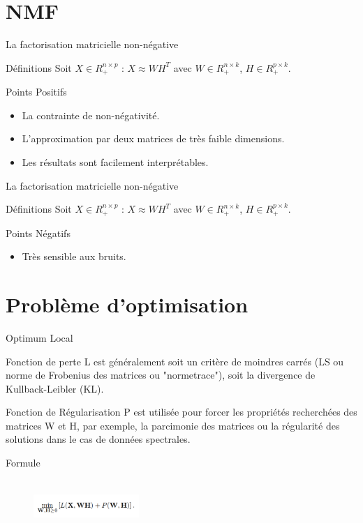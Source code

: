 \documentclass{beamer}
\begin{document}
\section{NMF}
\begin{frame}{La factorisation matricielle non-négative}
\begin{block}{Définitions}
Soit $X \in R_+^{n\times p}$ : $X \approx WH^T$ avec $W \in R_+^{n\times k}$, $H \in R_+^{p\times k}$.    
\end{block}
\begin{block}{Points Positifs}
\begin{itemize}
  \item La contrainte de non-négativité.
  \item L'approximation par deux matrices de très faible dimensions.
  \item Les résultats sont facilement interprétables.
\end{itemize}
\end{block}
\end{frame}

\begin{frame}{La factorisation matricielle non-négative}
\begin{block}{Définitions}
Soit $X \in R_+^{n\times p}$ : $X \approx WH^T$ avec $W \in R_+^{n\times k}$, $H \in R_+^{p\times k}$.    
\end{block}
\begin{block}{Points Négatifs}
\begin{itemize}
  \item Très sensible aux bruits.
\end{itemize}
\end{block}
\end{frame}

\section{Problème d'optimisation}
\begin{frame}{Optimum Local}
\begin{block}{Fonction de perte}
L est généralement soit un critère de moindres carrés (LS ou norme de Frobenius des matrices ou "normetrace"), soit la divergence de Kullback-Leibler (KL).
\end{block}
\begin{block}{Fonction de Régularisation}
P est utilisée pour forcer les propriétés recherchées des matrices W et H, par exemple, la parcimonie des matrices ou la régularité des solutions dans le cas de données spectrales.
\end{block}
\begin{block}{Formule}
\begin{figure}
\includegraphics[width=4cm ,height= 2cm]{fonction_de_min.png}
\end{figure}
\end{block}
\end{frame}
\end{document}
